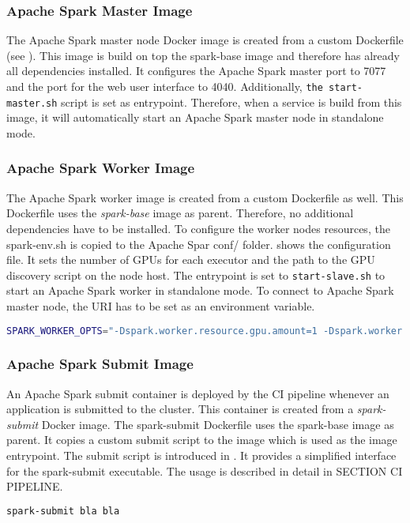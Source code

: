 \subsubsection{Apache Spark Master Image}
The Apache Spark master node Docker image is created from a custom Dockerfile (see ).
This image is build on top the spark-base image and therefore has already all dependencies installed.
It configures the Apache Spark master port to 7077 and the port for the web user interface to 4040.
Additionally, \texttt{the start-master.sh} script is set as entrypoint. Therefore, when a service is build from this image, it will automatically start an Apache Spark master node in standalone mode.


\subsubsection{Apache Spark Worker Image}
The Apache Spark worker image is created from a custom Dockerfile as well.
%
This Dockerfile uses the \textit{spark-base} image as parent.
%
Therefore, no additional dependencies have to be installed.
%
To configure the worker nodes resources, the spark-env.sh is copied to the Apache Spar conf/ folder.  shows the configuration file. It sets the number of GPUs for each executor and the path to the GPU discovery script on the node host.
%
The entrypoint is set to \texttt{start-slave.sh} to start an Apache Spark worker in standalone mode. To connect to Apache Spark master node, the URI has to be set as an environment variable.
\begin{lstlisting}[label=lst:06_env_depl_worker-env, caption=Environment configuration for all worker nodes, language=sh]
SPARK_WORKER_OPTS="-Dspark.worker.resource.gpu.amount=1 -Dspark.worker.resource.gpu.discoveryScript=/opt/sparkRapidsPlugin/getGpusResources.sh"
\end{lstlisting}


\subsubsection{Apache Spark Submit Image}
An Apache Spark submit container is deployed by the CI pipeline whenever an application is submitted to the cluster. This container is created from a \textit{spark-submit} Docker image.
The spark-submit Dockerfile uses the spark-base image as parent.
It copies a custom submit script to the image which is used as the image entrypoint.
The submit script is introduced in . It provides a simplified interface for the spark-submit executable.
The usage is described in detail in SECTION CI PIPELINE.
\begin{lstlisting}[label=lst:06_env_depl_submit, caption=Custom submit script, language=sh]
spark-submit bla bla
\end{lstlisting}


